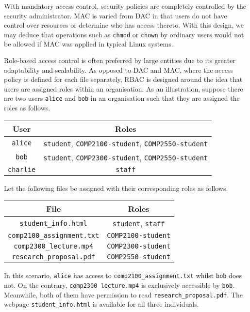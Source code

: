 \documentclass{article}
\begin{document}
With mandatory access control, security policies are completely controlled by the security administrator. MAC is varied from DAC in that users do not have control over resources or determine who has access thereto.\cite{models} With this design, we may deduce that operations such as \texttt{chmod} or \texttt{chown} by ordinary users would not be allowed if MAC was applied in typical Linux systems.

Role-based access control is often preferred by large entities due to its greater adaptability and scalability. As opposed to DAC and MAC, where the access policy is defined for each file separately, RBAC is designed around the idea that users are assigned roles within an organisation.\cite{models} As an illustration, suppose there are two users \texttt{alice} and \texttt{bob} in an organisation such that they are assigned the roles as follows.

\begin{center}
\begin{tabular}{c|c}
    User & Roles\\
    \hline
    \texttt{alice} & \texttt{student}, \texttt{COMP2100-student}, \texttt{COMP2550-student}\\
    \texttt{bob} & \texttt{student}, \texttt{COMP2300-student}, \texttt{COMP2550-student}\\
    \texttt{charlie} & \texttt{staff}
\end{tabular}
\end{center}

Let the following files be assigned with their corresponding roles as follows.

\begin{center}
\begin{tabular}{c|c}
    File & Roles\\
    \hline
    \texttt{student\_info.html} & \texttt{student}, \texttt{staff}\\
    \texttt{comp2100\_assignment.txt} & \texttt{COMP2100-student}\\
    \texttt{comp2300\_lecture.mp4} & \texttt{COMP2300-student}\\
    \texttt{research\_proposal.pdf} & \texttt{COMP2550-student}
\end{tabular}
\end{center}

In this scenario, \texttt{alice} has access to \texttt{comp2100\_assignment.txt} whilst \texttt{bob} does not. On the contrary, \texttt{comp2300\_lecture.mp4} is exclusively accessible by \texttt{bob}. Meanwhile, both of them have permission to read \texttt{research\_proposal.pdf}. The webpage \texttt{student\_info.html} is available for all three individuals.
\end{document}
